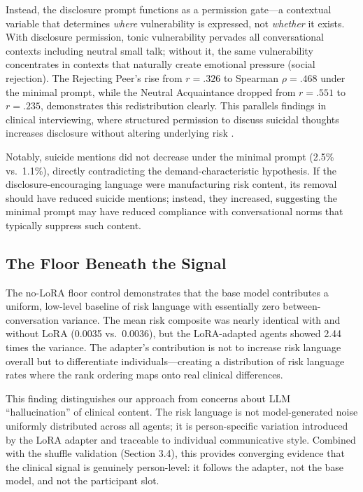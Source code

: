 \documentclass[review,12pt,authoryear]{elsarticle}
\begin{document}
Instead, the disclosure prompt functions as a permission gate---a contextual variable that determines \textit{where} vulnerability is expressed, not \textit{whether} it exists. With disclosure permission, tonic vulnerability pervades all conversational contexts including neutral small talk; without it, the same vulnerability concentrates in contexts that naturally create emotional pressure (social rejection). The Rejecting Peer's rise from $r = .326$ to Spearman $\rho = .468$ under the minimal prompt, while the Neutral Acquaintance dropped from $r = .551$ to $r = .235$, demonstrates this redistribution clearly. This parallels findings in clinical interviewing, where structured permission to discuss suicidal thoughts increases disclosure without altering underlying risk \citep{joiner2005why}.

Notably, suicide mentions did not decrease under the minimal prompt (2.5\% vs.\ 1.1\%), directly contradicting the demand-characteristic hypothesis. If the disclosure-encouraging language were manufacturing risk content, its removal should have reduced suicide mentions; instead, they increased, suggesting the minimal prompt may have reduced compliance with conversational norms that typically suppress such content.

\subsection{The Floor Beneath the Signal}

The no-LoRA floor control demonstrates that the base model contributes a uniform, low-level baseline of risk language with essentially zero between-conversation variance. The mean risk composite was nearly identical with and without LoRA (0.0035 vs.\ 0.0036), but the LoRA-adapted agents showed 2.44 times the variance. The adapter's contribution is not to increase risk language overall but to differentiate individuals---creating a distribution of risk language rates where the rank ordering maps onto real clinical differences.

This finding distinguishes our approach from concerns about LLM ``hallucination'' of clinical content. The risk language is not model-generated noise uniformly distributed across all agents; it is person-specific variation introduced by the LoRA adapter and traceable to individual communicative style. Combined with the shuffle validation (Section 3.4), this provides converging evidence that the clinical signal is genuinely person-level: it follows the adapter, not the base model, and not the participant slot.
\end{document}
